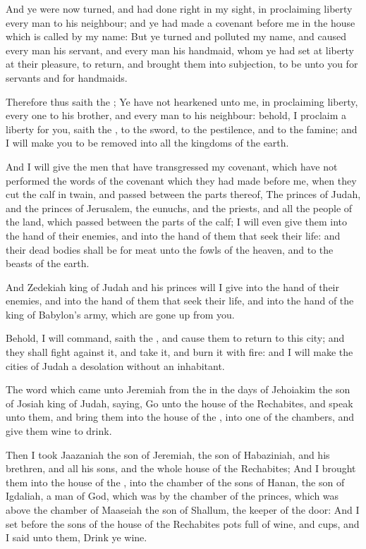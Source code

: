 \Verse And ye were now turned, and had done right in my sight, in proclaiming liberty every man to his neighbour; and ye had made a covenant before me in the house which is called by my name: \Verse But ye turned and polluted my name, and caused every man his servant, and every man his handmaid, whom ye had set at liberty at their pleasure, to return, and brought them into subjection, to be unto you for servants and for handmaids.

\Verse Therefore thus saith the \LORD; Ye have not hearkened unto me, in proclaiming liberty, every one to his brother, and every man to his neighbour: behold, I proclaim a liberty for you, saith the \LORD, to the sword, to the pestilence, and to the famine; and I will make you to be removed into all the kingdoms of the earth.

\Verse And I will give the men that have transgressed my covenant, which have not performed the words of the covenant which they had made before me, when they cut the calf in twain, and passed between the parts thereof, \Verse The princes of Judah, and the princes of Jerusalem, the eunuchs, and the priests, and all the people of the land, which passed between the parts of the calf; \Verse I will even give them into the hand of their enemies, and into the hand of them that seek their life: and their dead bodies shall be for meat unto the fowls of the heaven, and to the beasts of the earth.

\Verse And Zedekiah king of Judah and his princes will I give into the hand of their enemies, and into the hand of them that seek their life, and into the hand of the king of Babylon's army, which are gone up from you.

\Verse Behold, I will command, saith the \LORD, and cause them to return to this city; and they shall fight against it, and take it, and burn it with fire: and I will make the cities of Judah a desolation without an inhabitant.


\Chapter
\Verse The word which came unto Jeremiah from the \LORD in the days of Jehoiakim the son of Josiah king of Judah, saying, \Verse Go unto the house of the Rechabites, and speak unto them, and bring them into the house of the \LORD, into one of the chambers, and give them wine to drink.

\Verse Then I took Jaazaniah the son of Jeremiah, the son of Habaziniah, and his brethren, and all his sons, and the whole house of the Rechabites; \Verse And I brought them into the house of the \LORD, into the chamber of the sons of Hanan, the son of Igdaliah, a man of God, which was by the chamber of the princes, which was above the chamber of Maaseiah the son of Shallum, the keeper of the door: \Verse And I set before the sons of the house of the Rechabites pots full of wine, and cups, and I said unto them, Drink ye wine.

